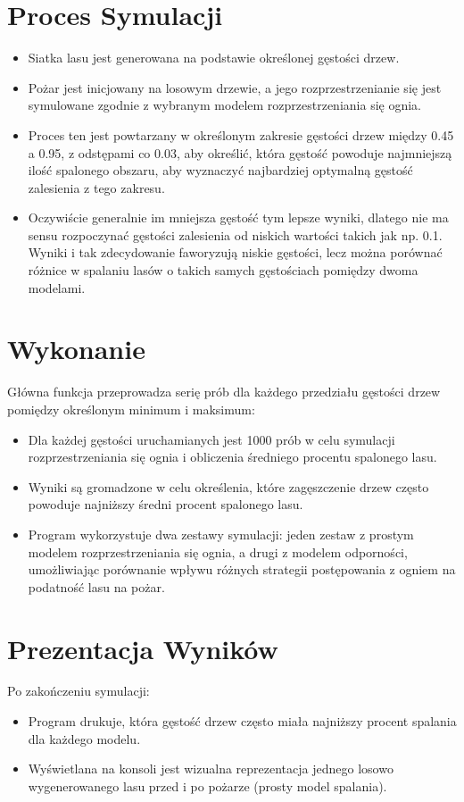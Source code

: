 \documentclass{article}
\begin{document}
\section*{Proces Symulacji}
\begin{itemize}
    \item Siatka lasu jest generowana na podstawie określonej gęstości drzew.
    \item Pożar jest inicjowany na losowym drzewie, a jego rozprzestrzenianie się jest symulowane zgodnie z wybranym modelem rozprzestrzeniania się ognia.
    \item Proces ten jest powtarzany w określonym zakresie gęstości drzew między 0.45 a 0.95, z odstępami co 0.03, aby określić, która gęstość powoduje najmniejszą ilość spalonego obszaru, aby wyznaczyć najbardziej optymalną gęstość zalesienia z tego zakresu. 
    \item Oczywiście generalnie im mniejsza gęstość tym lepsze wyniki, dlatego nie ma sensu rozpoczynać gęstości zalesienia od niskich wartości takich jak np. 0.1. Wyniki i tak zdecydowanie faworyzują niskie gęstości, lecz
    można porównać różnice w spalaniu lasów o takich samych gęstościach pomiędzy dwoma modelami.
\end{itemize}

\section*{Wykonanie}
Główna funkcja przeprowadza serię prób dla każdego przedziału gęstości drzew pomiędzy określonym minimum i maksimum:
\begin{itemize}
    \item Dla każdej gęstości uruchamianych jest 1000 prób w celu symulacji rozprzestrzeniania się ognia i obliczenia średniego procentu spalonego lasu.
    \item Wyniki są gromadzone w celu określenia, które zagęszczenie drzew często powoduje najniższy średni procent spalonego lasu.
    \item Program wykorzystuje dwa zestawy symulacji: jeden zestaw z prostym modelem rozprzestrzeniania się ognia, a drugi z modelem odporności, umożliwiając porównanie wpływu różnych strategii postępowania z ogniem na podatność lasu na pożar.
\end{itemize}

\section*{Prezentacja Wyników}
Po zakończeniu symulacji:
\begin{itemize}
    \item Program drukuje, która gęstość drzew często miała najniższy procent spalania dla każdego modelu.
    \item Wyświetlana na konsoli jest wizualna reprezentacja jednego losowo wygenerowanego lasu przed i po pożarze (prosty model spalania).
\end{itemize}
\end{document}
